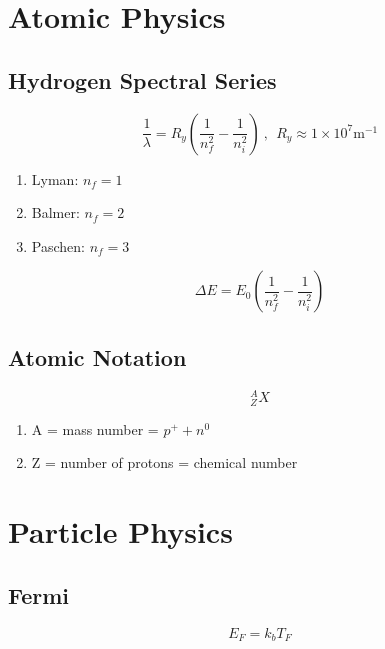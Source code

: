 \documentclass[10pt,a4paper]{article}
\begin{document}

\section{Atomic Physics}
\subsection{Hydrogen Spectral Series}
\begin{equation}
\frac{1}{\lambda} = R_y \left( \frac{1}{n_f^2} - \frac{1}{n_i^2} \right) ~,~~ R_y\approx 1\times 10^7 \textrm{m}^{-1}
\end{equation}

\begin{enumerate}
    \item Lyman: $n_f = 1$
    \item Balmer: $n_f = 2$
    \item Paschen: $n_f = 3$
\end{enumerate}

\begin{equation}
 \Delta E = E_0 \left( \frac{1}{n_f^2} - \frac{1}{n_i^2} \right)  
\end{equation}

\subsection{Atomic Notation}

\begin{equation}
  ^A_ZX
\end{equation}
\begin{enumerate}
    \item A = mass number = $p^+ + n^0$ 
    \item Z = number of protons = chemical number
\end{enumerate}


\section{Particle Physics}
\subsection{Fermi}
\begin{equation}
 E_F = k_bT_F 
\end{equation}
\end{document}
